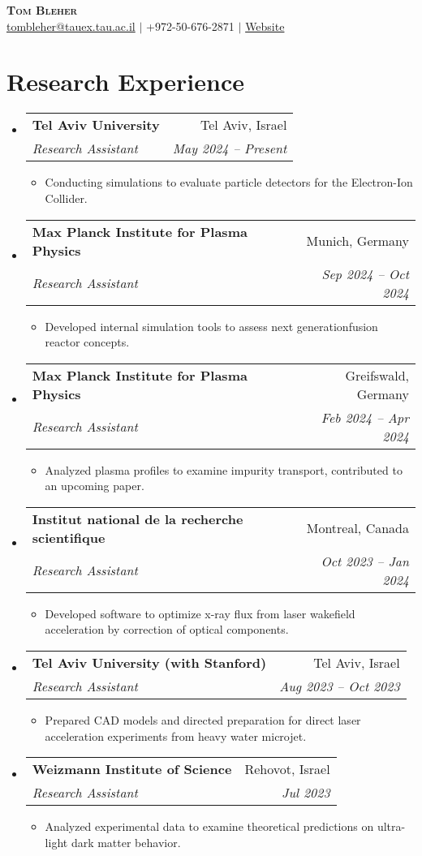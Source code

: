 \documentclass[letterpaper,11pt]{article}
\makeatletter
\newcommand{\resumeItem}[1]{
  \item\small{
    {#1 \vspace{-2pt}}
  }
}
\newcommand{\resumeSubheading}[4]{
  \vspace{-4pt}\item
    \begin{tabular*}{1\textwidth}[t]{l@{\extracolsep{\fill}}r}
      \textbf{#1} & #2 \\
      \textit{\small#3} & \textit{\small #4} \\
    \end{tabular*}\vspace{-7pt}
}
\newcommand{\resumeSubHeadingListStart}{\begin{itemize}[leftmargin=0.0in, label={}]}
\newcommand{\resumeSubHeadingListEnd}{\end{itemize}}
\newcommand{\resumeItemListStart}{\begin{itemize}}
\newcommand{\resumeItemListEnd}{\end{itemize}\vspace{-5pt}}
\makeatother
\begin{document}
\begin{center}
    \textbf{\LARGE \scshape Tom Bleher} \\ \vspace{1pt}
    \href{mailto:tombleher@tauex.tau.ac.il}{tombleher@tauex.tau.ac.il} $|$ 
    {+972-50-676-2871} $|$
    \href{https://english.tau.ac.il/profile/tombleher}{Website}
\end{center}

\section{Research Experience}
  \resumeSubHeadingListStart

    \resumeSubheading
      {Tel Aviv University}{Tel Aviv, Israel}
      {Research Assistant}{May 2024 -- Present}
      \resumeItemListStart
        \resumeItem{}
          {Conducting simulations to evaluate particle detectors for the Electron-Ion Collider.}
      \resumeItemListEnd

    \resumeSubheading
      {Max Planck Institute for Plasma Physics}{Munich, Germany}
      {Research Assistant}{Sep 2024 -- Oct 2024}
      \resumeItemListStart
        \resumeItem{}
          {Developed internal simulation tools to assess next generationfusion reactor concepts.}
      \resumeItemListEnd

    \resumeSubheading
      {Max Planck Institute for Plasma Physics}{Greifswald, Germany}
      {Research Assistant}{Feb 2024 -- Apr 2024}
      \resumeItemListStart
        \resumeItem{}
          {Analyzed plasma profiles to examine impurity transport, contributed to an upcoming paper.}
      \resumeItemListEnd
      
    \resumeSubheading
      {Institut national de la recherche scientifique}{Montreal, Canada}
      {Research Assistant}{Oct 2023 -- Jan 2024}
      \resumeItemListStart
        \resumeItem{}
          {Developed software to optimize x-ray flux from laser wakefield acceleration by correction of optical components.}
      \resumeItemListEnd

    \resumeSubheading
      {Tel Aviv University (with Stanford)}{Tel Aviv, Israel}
      {Research Assistant}{Aug 2023 -- Oct 2023}
      \resumeItemListStart
        \resumeItem{}
          {Prepared CAD models and directed preparation for direct laser acceleration experiments from heavy water microjet.}
      \resumeItemListEnd

    \resumeSubheading
      {Weizmann Institute of Science}{Rehovot, Israel}
      {Research Assistant}{Jul 2023}
      \resumeItemListStart
        \resumeItem{}
          {Analyzed experimental data to examine theoretical predictions on ultra-light dark matter behavior.}
      \resumeItemListEnd
  \resumeSubHeadingListEnd
\end{document}
